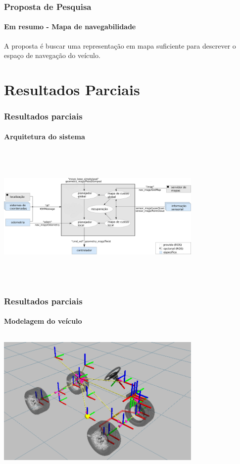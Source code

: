 \documentclass[brazil]{beamer}
\begin{document}
\begin{frame}
\frametitle{Proposta de Pesquisa}
\framesubtitle{Em resumo - Mapa de navegabilidade}
\begin{block}{}
A proposta é buscar uma representação em mapa suficiente para descrever o espaço de navegação
do veículo.
\end{block}
\end{frame}


\section{Resultados Parciais}

\begin{frame}
\frametitle{Resultados parciais}
\framesubtitle{Arquitetura do sistema}
\includegraphics[width=10cm,height=7cm,]{../img/overview_tf_pt.png}
\end{frame}

\begin{frame}
\frametitle{Resultados parciais}
\framesubtitle{Modelagem do veículo}
\includegraphics[width=10cm,height=7cm,]{../img/carina_tf_side_wheels_transp.png}
\end{frame}
\end{document}
